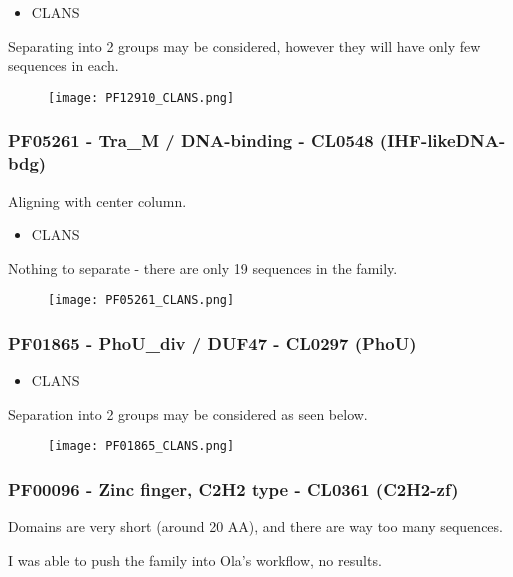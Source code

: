 \begin{itemize}
    \item CLANS
\end{itemize}
Separating into 2 groups may be considered, however they will have only few sequences in each.
\begin{figure}[H]
\begin{center}
\texttt{[image: PF12910\_CLANS.png]}
\end{center}
\end{figure}

    \subsubsection{PF05261 - Tra\_M / DNA-binding - CL0548 (IHF-likeDNA-bdg)}
Aligning with center column.
\begin{itemize}
    \item CLANS
\end{itemize}
Nothing to separate - there are only 19 sequences in the family.
\begin{figure}[H]
\begin{center}
\texttt{[image: PF05261\_CLANS.png]}
\end{center}
\end{figure}

   \subsubsection{PF01865 - PhoU\_div / DUF47 - CL0297 (PhoU)}

\begin{itemize}
    \item CLANS
\end{itemize}
Separation into 2 groups may be considered as seen below.
\begin{figure}[H]
\begin{center}
\texttt{[image: PF01865\_CLANS.png]}
\end{center}
\end{figure}

   \subsubsection{PF00096 - Zinc finger, C2H2 type - CL0361 (C2H2-zf)}
Domains are very short (around 20 AA), and there are way too many sequences.

I was able to push the family into Ola's workflow, no results.


